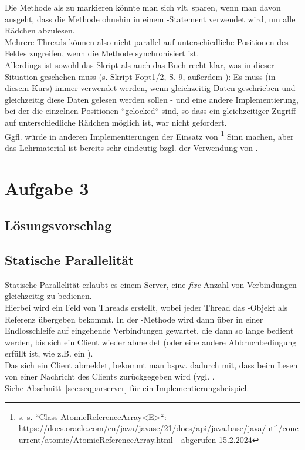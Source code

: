 \begin{tcolorbox}[colback=red!20,color=white,title=Anmerkung]
    Die Methode  als  zu markieren könnte man sich vlt. sparen, wenn man davon ausgeht,
    dass die Methode ohnehin in einem -Statement verwendet wird, um alle Rädchen abzulesen.\\
    Mehrere Threads können also nicht parallel auf unterschiedliche Positionen des Feldes zugreifen, wenn die Methode
    synchronisiert ist.\\
    Allerdings ist sowohl das Skript als auch das Buch recht klar, was in dieser Situation geschehen muss (s. Skript Fopt1/2, S. 9, außerdem \cite[31, Abschnitt 2.3.6]{Oec22}): Es muss (in diesem Kurs) immer  verwendet werden, wenn gleichzeitig
    Daten geschrieben und gleichzeitig diese Daten gelesen werden sollen - und eine andere Implementierung, bei der die
    einzelnen Positionen ``gelocked`` sind, so dass ein gleichzeitiger Zugriff auf unterschiedliche Rädchen möglich ist, war nicht gefordert.\\
    Ggfl. würde in anderen Implementierungen der Einsatz von \footnote{s. \cite[157 ff.]{Oec22}
    s. ``Class AtomicReferenceArray<E>``: \url{https://docs.oracle.com/en/java/javase/21/docs/api/java.base/java/util/concurrent/atomic/AtomicReferenceArray.html} - abgerufen 15.2.2024
    } Sinn machen, aber das Lehrmaterial ist bereits sehr eindeutig bzgl. der Verwendung von .
\end{tcolorbox}



\section{Aufgabe 3}
\subsection{Lösungsvorschlag}

\subsection*{Statische Parallelität}
Statische Parallelität erlaubt es einem Server, eine \textit{fixe} Anzahl von Verbindungen gleichzeitig zu bedienen.\\
Hierbei wird ein Feld von Threads erstellt, wobei jeder Thread das -Objekt als Referenz übergeben bekommt.
In der -Methode wird dann über  in einer Endlosschleife auf eingehende Verbindungen gewartet, die dann so lange bedient werden, bis sich ein Client wieder abmeldet (oder eine andere Abbruchbedingung erfüllt ist, wie z.B. ein ).\\
Das sich ein Client abmeldet, bekommt man bspw. dadurch mit, dass  beim Lesen von einer Nachricht des Clients zurückgegeben wird (vgl. \cite[286]{Oec22}. \\
Siehe Abschnitt~\ref{sec:seqparserver} für ein Implementierungsbeispiel.

